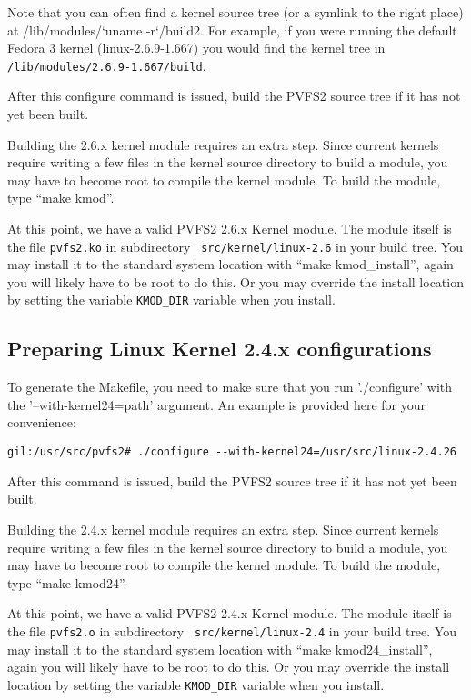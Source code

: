 \documentclass[11pt, letterpaper]{article}
\begin{document}
Note that you can often find a kernel source tree (or a symlink to the
right place) at /lib/modules/`uname -r`/build2.  For example, if you were
running the default Fedora 3 kernel (linux-2.6.9-1.667) you would find the
kernel tree in \texttt{/lib/modules/2.6.9-1.667/build}.

After this configure command is issued, build the PVFS2 source tree if it
has not yet been built.

Building the 2.6.x kernel module requires an extra step.  Since
current kernels require writing a few files in the kernel source
directory to build a module, you may have to become root to compile
the kernel module.  To build the module, type ``make kmod''.

At this point, we have a valid PVFS2 2.6.x Kernel module.  The module
itself is the file {\tt pvfs2.ko} in subdirectory {\tt
src/kernel/linux-2.6} in your build tree.  You may install it to the
standard system location with ``make kmod\_install'', again you will
likely have to be root to do this.  Or you may override the install
location by setting the variable {\tt KMOD\_DIR} variable when you
install.

\subsection{Preparing Linux Kernel 2.4.x configurations}
\label{sec:vfs24-configure}

To generate the Makefile, you need to make sure that you run
'./configure' with the '--with-kernel24=path' argument.  An example is
provided here for your convenience:

\begin{verbatim}
gil:/usr/src/pvfs2# ./configure --with-kernel24=/usr/src/linux-2.4.26
\end{verbatim}

After this command is issued, build the PVFS2 source tree if it has
not yet been built.

Building the 2.4.x kernel module requires an extra step.  Since
current kernels require writing a few files in the kernel source
directory to build a module, you may have to become root to compile
the kernel module.  To build the module, type ``make kmod24''.

At this point, we have a valid PVFS2 2.4.x Kernel module.  The module
itself is the file {\tt pvfs2.o} in subdirectory {\tt
src/kernel/linux-2.4} in your build tree.  You may install it to the
standard system location with ``make kmod24\_install'', again you will
likely have to be root to do this.  Or you may override the install
location by setting the variable {\tt KMOD\_DIR} variable when you
install.
\end{document}
